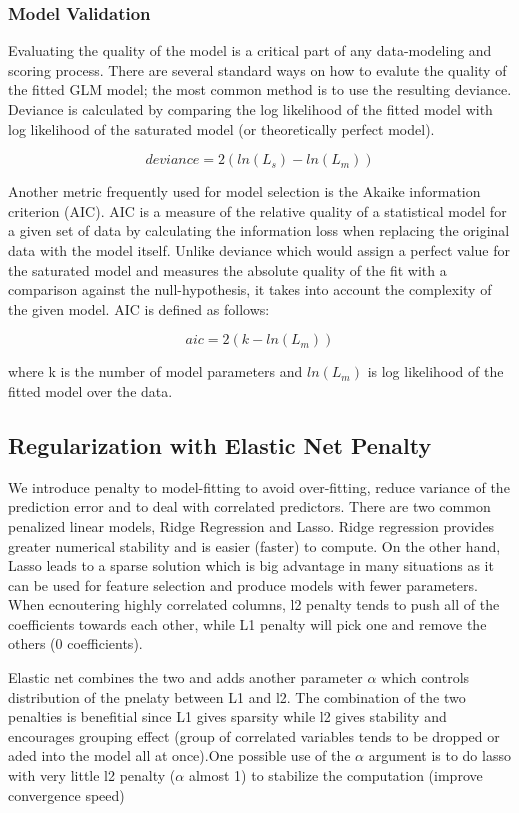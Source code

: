\documentclass[11pt]{article}
\begin{document}
\subsubsection{Model Validation}
Evaluating the quality of the model is a critical part of any data-modeling and scoring process. There are several standard ways on how to evalute the quality of the fitted GLM model; the most common method is to use the resulting deviance. Deviance is calculated by comparing the log likelihood of the fitted model with log likelihood of the saturated model (or theoretically perfect model).

\[ deviance = 2({ln(L_{s})} - {ln(L_{m})}) \]

Another metric frequently used for model selection is the Akaike information criterion (AIC). AIC is a measure of the relative quality of a statistical model for a given set of data by calculating the information loss when replacing the original data with the model itself. Unlike deviance which would assign a perfect value for the saturated model and measures the absolute quality of the fit with a comparison against the null-hypothesis, it takes into account the complexity of the given model. AIC is defined as follows:

\[ aic = 2(k - ln(L_{m}))\]

\noindent
where k is the number of model parameters and $ln(L_{m})$ is log likelihood of the fitted model over the data.

\subsection{Regularization with Elastic Net Penalty} 
We introduce penalty to model-fitting to avoid over-fitting, reduce variance of the prediction error and to deal with correlated predictors. There are two common penalized linear models, Ridge Regression and Lasso. Ridge regression provides greater numerical stability and is easier (faster) to compute. On the other hand, Lasso leads to a sparse solution which is big advantage in many situations as it can be used for feature selection and produce models with fewer parameters. When ecnoutering highly correlated columns, l2 penalty tends to push all of the coefficients towards each other, while L1 penalty will pick one and remove the others (0 coefficients).

Elastic net combines the two and adds another parameter $\alpha$ which controls distribution of the pnelaty between L1 and l2. The combination of the two penalties is benefitial since L1 gives sparsity while l2 gives stability and encourages grouping effect (group of correlated variables tends to be dropped or aded into the model all at once).One possible use of the $\alpha$ argument is to do lasso with very little l2 penalty ($\alpha$ almost 1) to stabilize the computation (improve convergence speed)
\end{document}
